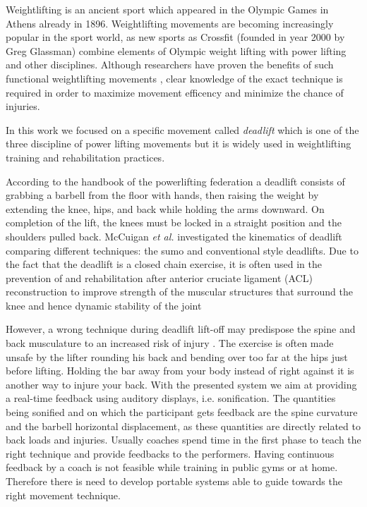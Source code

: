 \documentclass[10pt,letterpaper]{article}
\begin{document}
Weightlifting is an ancient sport which appeared in the Olympic Games in Athens already in 1896. Weightlifting movements are becoming increasingly popular in the sport world, as new sports as Crossfit (founded in year 2000 by Greg Glassman) combine elements of Olympic weight lifting with power lifting and other disciplines.
Although researchers have proven the benefits of such functional weightlifting movements \cite{smith2013crossfit}, clear knowledge of the exact technique is required in order to maximize movement efficency and minimize the chance of injuries.

In this work we focused on a specific movement called \emph{deadlift} which is one of the three discipline of power lifting movements but it is widely used in weightlifting training and rehabilitation practices.

According to the handbook of the powerlifting federation \cite{} a deadlift consists of grabbing a barbell from the floor with hands, then raising the weight by extending the knee, hips, and back while holding the arms downward. On completion of the lift, the knees must be locked in a straight position and the shoulders pulled back.
McCuigan \emph{et al.} investigated the kinematics of deadlift comparing different techniques: the sumo and conventional style deadlifts.
Due to the fact that the deadlift is a closed chain exercise, it is often used in the prevention of and rehabilitation after anterior cruciate ligament (ACL) reconstruction to improve strength of the muscular structures that surround the knee and hence dynamic stability of the joint 

However, a wrong technique during deadlift lift-off may predispose the spine and back musculature to an increased risk of injury \cite{granhed1987loads,cholewicki1991lumbar}. The exercise is often made unsafe by the lifter rounding his back and bending over too far at the hips just before lifting. Holding the bar away from your body instead of right against it is another way to injure your back. 
With the presented system we aim at providing a real-time feedback using auditory displays, i.e. sonification. The quantities being sonified and on which the participant gets feedback are the spine curvature and the barbell horizontal displacement, as these quantities are directly related to back loads and injuries.
Usually coaches spend time in the first phase to teach the right technique and provide feedbacks to the performers.
Having continuous feedback by a coach is not feasible while training in public gyms or at home. Therefore there is need to develop portable systems able to guide towards the right movement technique.
\end{document}
